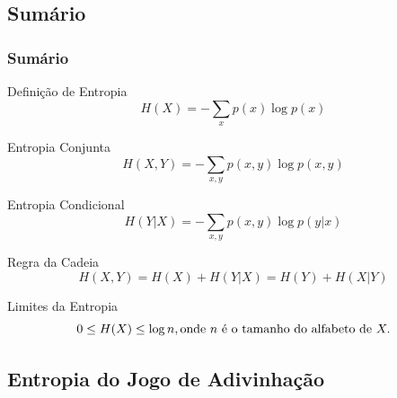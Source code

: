\subsection{Sumário}
\begin{frame}%
  \frametitle{Sumário}
  Definição de Entropia
  \begin{equation}
  H(X) = - \sum_x p(x) \log p(x)
  \end{equation}

  Entropia Conjunta
  \begin{equation}
  H(X,Y) = - \sum_{x,y} p(x,y) \log p(x,y)
  \end{equation}

  Entropia Condicional
  \begin{equation}
  H(Y|X) = - \sum_{x,y} p(x,y) \log p(y|x)
  \end{equation}

  Regra da Cadeia
  \begin{equation}
  H(X,Y) = H(X) + H(Y|X) = H(Y) + H(X|Y)
  \end{equation}

  Limites da Entropia
  \begin{equation}
  0 \leq H(X) \leq \log n , \textmd{onde } n \textmd{ é o tamanho do alfabeto de } X.
  \end{equation}

\end{frame}


\subsection{Entropia do Jogo de Adivinhação}

